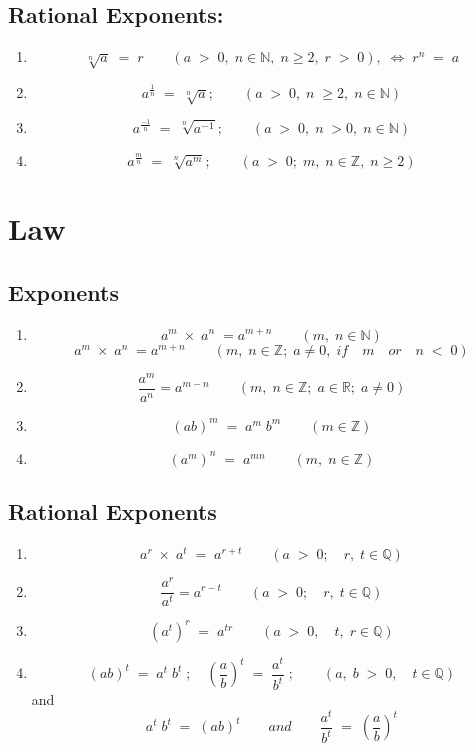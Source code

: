 \subsection{Rational Exponents:}
\begin{enumerate}
\item
\[\sqrt[n]{a} \; = \; r \qquad (a \; > \; 0, \; n \in \mathbb{N}, \; n \geqslant 2, \; r \; > \; 0), \; \Longleftrightarrow \; r^n \; = \; a\]
\item
\[a^{\frac{1}{n}} \; = \; \sqrt[n]{a}; \qquad (a \; > \; 0, \; n \; \geqslant 2, \; n \in \mathbb{N})\]
\item
\[a^{\frac{-1}{n}} \; = \; \sqrt[n]{a^{-1}}; \qquad (a \; > \; 0, \; n \; > 0, \; n \in \mathbb{N} )\]
\item
\[a^{\frac{m}{n}} \; = \; \sqrt[n]{a^m}; \qquad (a \; > \; 0; \; m, \; n \in \mathbb{Z}, \; n \geqslant 2 )\]
\end{enumerate}
\newpage
\section{Law}
\subsection{Exponents}
\begin{enumerate}
\item
\[a^m \; \times \; a^n \; = a^{m+n} \qquad (m, \; n \in \mathbb{N})\]
\[a^m \; \times \; a^n \; = a^{m+n} \qquad (m, \; n \in \mathbb{Z}; \; a \neq 0, \; if \quad m \quad or \quad n \; < \; 0)\]
\item
\[\frac{a^m}{a^n}=a^{m-n} \qquad (m, \; n \in \mathbb{Z}; \; a \in \mathbb{R}; \; a \neq 0)\]
\item
\[(ab)^m \; = \; a^m \; b^m \qquad (m \in \mathbb{Z})\]
\item
\[(a^m)^n \; = \; a^{mn} \qquad (m, \; n \in \mathbb{Z})\]
\end{enumerate}
\subsection{Rational Exponents}
\begin{enumerate}
\item
\[a^r \; \times \; a^t \; = \; a^{r+t} \qquad (a \; > \; 0; \quad r, \; t \in \mathbb{Q})\]
\item
\[\frac{a^r}{a^t}=a^{r-t} \qquad (a \; > \; 0; \quad r, \;t \in \mathbb{Q})\]
\item
\[(a^t)^r \; = \; a^{tr} \qquad (a \; > \; 0, \quad t, \; r \in \mathbb{Q})\]
\item
\[(ab)^t \; = \; a^t \; b^t \; ; \quad \left(\frac{a}{b}\right)^t \; = \; \frac{a^t}{b^t} \; ; \qquad (a, \; b \; > \; 0, \quad t \in \mathbb{Q})\]
and\\
\[a^t \; b^t \; = \; (ab)^t \qquad and \qquad \frac{a^t}{b^t} \; = \; \left(\frac{a}{b}\right)^t\]
\end{enumerate}
